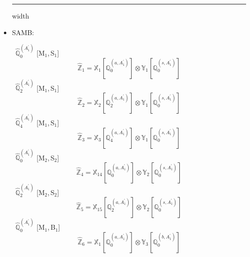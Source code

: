 \documentclass[fleqn,10pt,landscape]{article}
\begin{document}
\begin{itemize}
 \hfil \hrule height 1mm width \textwidth \hfil

\item SAMB:

\vspace{4mm}
\noindent {} $\,\,\,\hat{\mathbb{Q}}_{0}^{(A_{1}^{\prime})}$ [M$_{1}$,\,S$_{1}$]
\begin{dmath*}
\hat{\mathbb{Z}}_{1}=\mathbb{X}_{1}[\mathbb{Q}_{0}^{(a,A_{1}^{\prime})}] \otimes\mathbb{Y}_{1}[\mathbb{Q}_{0}^{(s,A_{1}^{\prime})}]
\end{dmath*}
\vspace{4mm}
\noindent {} $\,\,\,\hat{\mathbb{Q}}_{2}^{(A_{1}^{\prime})}$ [M$_{1}$,\,S$_{1}$]
\begin{dmath*}
\hat{\mathbb{Z}}_{2}=\mathbb{X}_{2}[\mathbb{Q}_{2}^{(a,A_{1}^{\prime})}] \otimes\mathbb{Y}_{1}[\mathbb{Q}_{0}^{(s,A_{1}^{\prime})}]
\end{dmath*}
\vspace{4mm}
\noindent {} $\,\,\,\hat{\mathbb{Q}}_{4}^{(A_{1}^{\prime})}$ [M$_{1}$,\,S$_{1}$]
\begin{dmath*}
\hat{\mathbb{Z}}_{3}=\mathbb{X}_{3}[\mathbb{Q}_{4}^{(a,A_{1}^{\prime})}] \otimes\mathbb{Y}_{1}[\mathbb{Q}_{0}^{(s,A_{1}^{\prime})}]
\end{dmath*}
\vspace{4mm}
\noindent {} $\,\,\,\hat{\mathbb{Q}}_{0}^{(A_{1}^{\prime})}$ [M$_{2}$,\,S$_{2}$]
\begin{dmath*}
\hat{\mathbb{Z}}_{4}=\mathbb{X}_{14}[\mathbb{Q}_{0}^{(a,A_{1}^{\prime})}] \otimes\mathbb{Y}_{2}[\mathbb{Q}_{0}^{(s,A_{1}^{\prime})}]
\end{dmath*}
\vspace{4mm}
\noindent {} $\,\,\,\hat{\mathbb{Q}}_{2}^{(A_{1}^{\prime})}$ [M$_{2}$,\,S$_{2}$]
\begin{dmath*}
\hat{\mathbb{Z}}_{5}=\mathbb{X}_{15}[\mathbb{Q}_{2}^{(a,A_{1}^{\prime})}] \otimes\mathbb{Y}_{2}[\mathbb{Q}_{0}^{(s,A_{1}^{\prime})}]
\end{dmath*}
\vspace{4mm}
\noindent {} $\,\,\,\hat{\mathbb{Q}}_{0}^{(A_{1}^{\prime})}$ [M$_{1}$,\,B$_{1}$]
\begin{dmath*}
\hat{\mathbb{Z}}_{6}=\mathbb{X}_{1}[\mathbb{Q}_{0}^{(a,A_{1}^{\prime})}] \otimes\mathbb{Y}_{3}[\mathbb{Q}_{0}^{(b,A_{1}^{\prime})}]

\end{dmath*}
\end{itemize}
\end{document}
